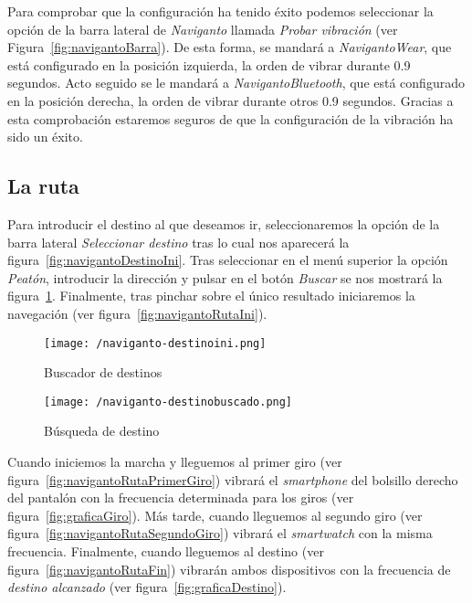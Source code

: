 Para comprobar que la configuración ha tenido éxito podemos seleccionar la opción de la barra
lateral de \emph{Naviganto} llamada \emph{Probar vibración} (ver
Figura~\ref{fig:navigantoBarra}). De esta forma, se mandará a \emph{NavigantoWear}, que está
configurado en la posición izquierda, la orden de vibrar durante 0.9 segundos. Acto seguido se le
mandará a \emph{NavigantoBluetooth}, que está configurado en la posición derecha, la orden de vibrar
durante otros 0.9 segundos. Gracias a esta comprobación estaremos seguros de que la configuración de
la vibración ha sido un éxito.

\subsection{La ruta}

Para introducir el destino al que deseamos ir, seleccionaremos la opción de la barra lateral
\emph{Seleccionar destino} tras lo cual nos aparecerá la figura~\ref{fig:navigantoDestinoIni}. Tras
seleccionar en el menú superior la opción \emph{Peatón}, introducir la dirección y pulsar en el
botón \emph{Buscar} se nos mostrará la figura~\ref{fig:navigantoDestinoBuscado}. Finalmente, tras
pinchar sobre el único resultado iniciaremos la navegación (ver figura~\ref{fig:navigantoRutaIni}).

\begin{figure}[!h]
  \begin{minipage}[b]{0.5\linewidth}
    \begin{center}
      \texttt{[image: /naviganto-destinoini.png]}
      \caption{Buscador de destinos}
      \label{fig:navigantoDestinoIni}
    \end{center}
  \end{minipage}
  \begin{minipage}[b]{0.5\linewidth}
    \begin{center}
      \texttt{[image: /naviganto-destinobuscado.png]}
      \caption{Búsqueda de destino}
      \label{fig:navigantoDestinoBuscado}
    \end{center}
  \end{minipage}
\end{figure}

Cuando iniciemos la marcha y lleguemos al primer giro (ver figura~\ref{fig:navigantoRutaPrimerGiro})
vibrará el \emph{smartphone} del bolsillo derecho del pantalón con la frecuencia determinada para
los giros (ver figura~\ref{fig:graficaGiro}). Más tarde, cuando lleguemos al segundo giro (ver
figura~\ref{fig:navigantoRutaSegundoGiro}) vibrará el \emph{smartwatch} con la misma
frecuencia. Finalmente, cuando lleguemos al destino (ver figura~\ref{fig:navigantoRutaFin}) vibrarán
ambos dispositivos con la frecuencia de \emph{destino alcanzado} (ver
figura~\ref{fig:graficaDestino}).

